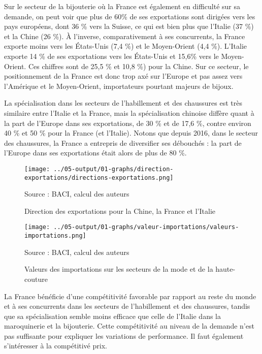 \documentclass[french,10pt,a4paper]{article}
\begin{document}
Sur le secteur de la bijouterie où la France est également en difficulté sur sa demande, on peut voir que plus de 60\% de ses exportations sont dirigées vers les pays européens, dont 36 \% vers la Suisse, ce qui est bien plus que l'Italie (37 \%) et la Chine (26 \%). À l'inverse, comparativement à ses concurrents, la France exporte moins vers les États-Unis (7,4 \%) et le Moyen-Orient (4,4 \%). L'Italie exporte 14 \% de ses exportations vers les États-Unis et 15,6\% vers le Moyen-Orient. Ces chiffres sont de 25,5 \% et 10,8 \%) pour la Chine. Sur ce secteur, le positionnement de la France est donc trop axé sur l'Europe et pas assez vers l'Amérique et le Moyen-Orient, importateurs pourtant majeurs de bijoux.

La spécialisation dans les secteurs de l'habillement et des chaussures est très similaire entre l'Italie et la France, mais la spécialisation chinoise diffère quant à la part de l'Europe dans ses exportations, de 30 \% et de 17,6 \%, contre environ 40 \% et 50 \% pour la France (et l’Italie). Notons que depuis 2016, dans le secteur des chaussures, la France a entrepris de diversifier ses débouchés : la part de l'Europe dans ses exportations était alors de plus de 80 \%. 

\begin{figure}[!h]
  \centering
  \texttt{[image: ../05-output/01-graphs/direction-exportations/directions-exportations.png]}
  \captionsetup{justification=raggedright,singlelinecheck=false, font=small}
  \caption*{Source : BACI, calcul des auteurs}
  \captionsetup{justification=centering, singlelinecheck=true, font=normalsize}
  \caption{Direction des exportations pour la Chine, la France et l'Italie}
  \label{fig:direction-exportations}
\end{figure}

\begin{figure}[!h]
  \centering
  \texttt{[image: ../05-output/01-graphs/valeur-importations/valeurs-importations.png]}
  \captionsetup{justification=raggedright,singlelinecheck=false, font=small}
  \caption*{Source : BACI, calcul des auteurs}
  \captionsetup{justification=centering, singlelinecheck=true, font=normalsize}
  \caption{Valeurs des importations sur les secteurs de la mode et de la haute-couture}
  \label{fig:valeurs-importations}
\end{figure}

La France bénéficie d'une compétitivité favorable par rapport au reste du monde et à ses concurrents dans les secteurs de l'habillement et des chaussures, tandis que sa spécialisation semble moins efficace que celle de l'Italie dans la maroquinerie et la bijouterie. Cette compétitivité au niveau de la demande n'est pas suffisante pour expliquer les variations de performance. Il faut également s'intéresser à la compétitivé prix.
\end{document}
